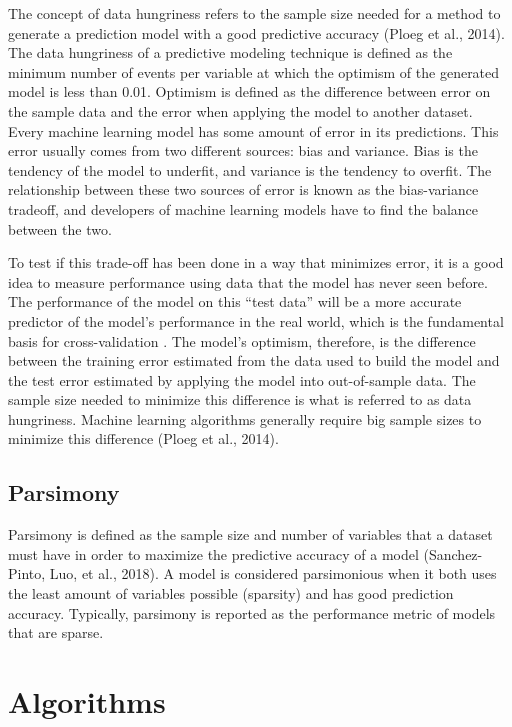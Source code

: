 \documentclass[
  man]{apa7}
\begin{document}
The concept of data hungriness refers to the sample size needed for a method to generate a prediction model with a good predictive accuracy (Ploeg et al., 2014).
The data hungriness of a predictive modeling technique is defined as the minimum number of events per variable at which the optimism of the generated model is less than 0.01.
Optimism is defined as the difference between error on the sample data and the error when applying the model to another dataset.
Every machine learning model has some amount of error in its predictions.
This error usually comes from two different sources: bias and variance.
Bias is the tendency of the model to underfit, and variance is the tendency to overfit.
The relationship between these two sources of error is known as the bias-variance tradeoff, and developers of machine learning models have to find the balance between the two.

To test if this trade-off has been done in a way that minimizes error, it is a good idea to measure performance using data that the model has never seen before.
The performance of the model on this ``test data'' will be a more accurate predictor of the model's performance in the real world, which is the fundamental basis for cross-validation .
The model's optimism, therefore, is the difference between the training error estimated from the data used to build the model and the test error estimated by applying the model into out-of-sample data.
The sample size needed to minimize this difference is what is referred to as data hungriness.
Machine learning algorithms generally require big sample sizes to minimize this difference (Ploeg et al., 2014).

\hypertarget{parsimony}{%
\subsection{Parsimony}\label{parsimony}}

Parsimony is defined as the sample size and number of variables that a dataset must have in order to maximize the predictive accuracy of a model (Sanchez-Pinto, Luo, et al., 2018).
A model is considered parsimonious when it both uses the least amount of variables possible (sparsity) and has good prediction accuracy.
Typically, parsimony is reported as the performance metric of models that are sparse.

\hypertarget{algorithms}{%
\section{Algorithms}\label{algorithms}}
\end{document}
